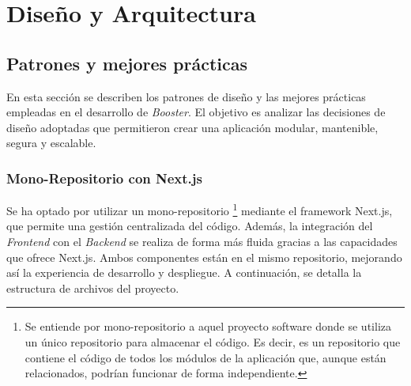\chapter{Diseño y Arquitectura}


\section{Patrones y mejores prácticas}

En esta sección se describen los patrones de diseño y las mejores prácticas empleadas en el desarrollo de \textit{Booster}. El objetivo es analizar las decisiones de diseño adoptadas que permitieron crear una aplicación modular, mantenible, segura y escalable. 

\subsection{Mono-Repositorio con Next.js}
Se ha optado por utilizar un mono-repositorio \footnote{Se entiende por mono-repositorio a aquel proyecto software donde se utiliza un único repositorio para almacenar el código. Es decir, es un repositorio que contiene el código de todos los módulos de la aplicación que, aunque están relacionados, podrían funcionar de forma independiente.} mediante el framework Next.js, que permite una gestión centralizada del código. Además, la integración del \textit{Frontend} con el \textit{Backend} se realiza de forma más fluida gracias a las capacidades que ofrece Next.js. Ambos componentes están en el mismo repositorio, mejorando así la experiencia de desarrollo y despliegue.
A continuación, se detalla la estructura de archivos del proyecto.

\clearpage


